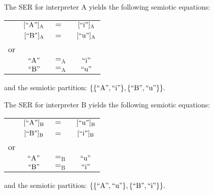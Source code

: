 \documentclass[12pt]{article}
\begin{document}
The SER for interpreter $\mathrm{A}$ yields the following semiotic equations:

\begin{tabular}{lclc}
& $[\mathrm{``A"}]_{\mathrm{A}}$ & $=$ & $[\mathrm{``i"}]_{\mathrm{A}}$ \\
& $[\mathrm{``B"}]_{\mathrm{A}}$ & $=$ & $[\mathrm{``u"}]_{\mathrm{A}}$ \\
or \\
& $\mathrm{``A"}$ & $=_{\mathrm{A}}$ & $\mathrm{``i"}$ \\
& $\mathrm{``B"}$ & $=_{\mathrm{A}}$ & $\mathrm{``u"}$ \\
\end{tabular}

and the semiotic partition:  $\{ \{ \mathrm{``A"}, \mathrm{``i"} \}, \{ \mathrm{``B"}, \mathrm{``u"} \} \}.$

The SER for interpreter $\mathrm{B}$ yields the following semiotic equations:

\begin{tabular}{lclc}
& $[\mathrm{``A"}]_{\mathrm{B}}$ & $=$ & $[\mathrm{``u"}]_{\mathrm{B}}$ \\
& $[\mathrm{``B"}]_{\mathrm{B}}$ & $=$ & $[\mathrm{``i"}]_{\mathrm{B}}$ \\
or \\
& $\mathrm{``A"}$ & $=_{\mathrm{B}}$ & $\mathrm{``u"}$ \\
& $\mathrm{``B"}$ & $=_{\mathrm{B}}$ & $\mathrm{``i"}$ \\
\end{tabular}

and the semiotic partition:  $\{ \{ \mathrm{``A"}, \mathrm{``u"} \}, \{ \mathrm{``B"}, \mathrm{``i"} \} \}.$

\end{document}
